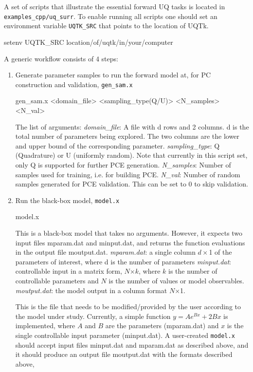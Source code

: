 A set of scripts that illustrate the essential forward UQ tasks is located in  \texttt{examples\_cpp/uq\_surr}.
To enable running all scripts one should set an environment variable \texttt{UQTK\_SRC} that points to the location of UQTk.

\begin{ShellCmd}
setenv UQTK_SRC location/of/uqtk/in/your/computer
\end{ShellCmd}


A generic workflow consists of 4 steps:
\begin{enumerate}
\item Generate parameter samples to run the forward model at, for PC construction and validation, \texttt{gen\_sam.x}
\begin{ShellCmd}
gen_sam.x <domain_file> <sampling_type(Q/U)> <N_samples> <N_val>
\end{ShellCmd}
The list of arguments:
\subitem \emph{domain\_file}: A file with \bgmth d \endmth rows and 2 columns. \bgmth d \endmth is the total number of parameters being explored.
           The two columns are the lower and upper bound of the corresponding parameter.
\subitem \emph{sampling\_type}: Q (Quadrature) or U (uniformly random). Note that currently in this script set, only Q is supported for further PCE generation.
\subitem \emph{N\_samples}: Number of samples used for training, i.e. for building PCE.
\subitem \emph{N\_val}:  Number of random samples generated for PCE validation. This can be set to 0 to skip validation.

\item Run the black-box model, \texttt{model.x}
\begin{ShellCmd}
model.x
\end{ShellCmd}
This is a black-box model that takes no arguments. However, it expects two input files mparam.dat and minput.dat, and returns the function evaluations in the output file moutput.dat.
\subitem \emph{mparam.dat}: a single column $d\times$1 of the parameters of interest, where d is the number of parameters 
\subitem \emph{minput.dat}: controllable input in a matrix form, $N$$\times$$k$, where $k$ is the number of controllable parameters and $N$ is the number of values or model observables.
\subitem \emph{moutput.dat}: the model output in a column format $N$$\times$1.

This is the file that needs to be modified/provided by the user according to the model under study. Currently, a simple function $y=Ae^{Bx}+2Bx$ is implemented, where $A$ and $B$ are the parameters (mparam.dat) and $x$ is the single controllable input parameter (minput.dat). A user-created \texttt{model.x} should accept input files minput.dat and mparam.dat as described above, and it should produce an output file moutput.dat with the formats described above, 


\end{enumerate}

